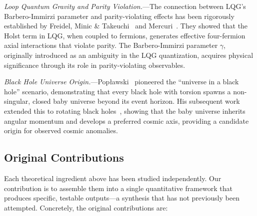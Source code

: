 \documentclass[aps,prd,twocolumn,superscriptaddress,showpacs,preprintnumbers,nofootinbib,longbibliography,floatfix]{revtex4-2}
\begin{document}
\textit{Loop Quantum Gravity and Parity Violation.}---The connection between LQG's Barbero-Immirzi parameter and parity-violating effects has been rigorously established by Freidel, Minic \& Takeuchi~\cite{Freidel2005} and Mercuri~\cite{Mercuri2006,Mercuri2009}. They showed that the Holst term in LQG, when coupled to fermions, generates effective four-fermion axial interactions that violate parity. The Barbero-Immirzi parameter $\gamma$, originally introduced as an ambiguity in the LQG quantization, acquires physical significance through its role in parity-violating observables.

\textit{Black Hole Universe Origin.}---Pop\l{}awski~\cite{Poplawski2016} pioneered the ``universe in a black hole'' scenario, demonstrating that every black hole with torsion spawns a non-singular, closed baby universe beyond its event horizon. His subsequent work extended this to rotating black holes~\cite{Poplawski2019}, showing that the baby universe inherits angular momentum and develops a preferred cosmic axis, providing a candidate origin for observed cosmic anomalies.


\subsection{Original Contributions}\label{sec:contributions}

Each theoretical ingredient above has been studied independently. Our contribution is to assemble them into a single quantitative framework that produces specific, testable outputs---a synthesis that has not previously been attempted. Concretely, the original contributions are:
\end{document}
